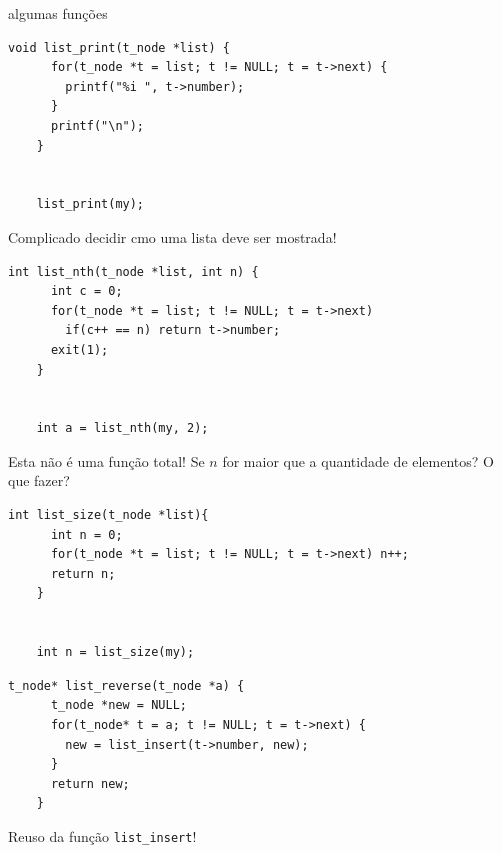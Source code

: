 \documentclass{beamer}
\begin{document}
\begin{frame}{algumas funções}

  \begin{lstlisting}[style=normalc]
    void list_print(t_node *list) {
      for(t_node *t = list; t != NULL; t = t->next) {
        printf("%i ", t->number);
      }
      printf("\n");
    }

    
    list_print(my);
  \end{lstlisting}

  Complicado decidir cmo uma lista deve ser mostrada!

  \framebreak

  \begin{lstlisting}[style=normalc]
    int list_nth(t_node *list, int n) {
      int c = 0;
      for(t_node *t = list; t != NULL; t = t->next)
        if(c++ == n) return t->number;
      exit(1);
    }

    
    int a = list_nth(my, 2);
  \end{lstlisting}

  Esta não é uma função total! Se $n$ for maior que a quantidade de
  elementos? O que fazer?

  \framebreak

  \begin{lstlisting}[style=normalc]
    int list_size(t_node *list){
      int n = 0;
      for(t_node *t = list; t != NULL; t = t->next) n++;
      return n;
    }
    

    int n = list_size(my);
  \end{lstlisting}

  \framebreak

  \begin{lstlisting}[style=normalc]
    t_node* list_reverse(t_node *a) {
      t_node *new = NULL;
      for(t_node* t = a; t != NULL; t = t->next) {
        new = list_insert(t->number, new);
      }
      return new;
    }
  \end{lstlisting}

  Reuso da função \texttt{list\_insert}! 

\end{frame}
\end{document}
